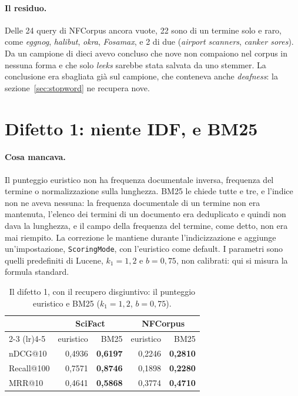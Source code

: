 \paragraph{Il residuo.} Delle 24 query di NFCorpus ancora vuote, 22 sono di un
termine solo e raro, come \emph{eggnog}, \emph{halibut}, \emph{okra},
\emph{Fosamax}, e 2 di due (\emph{airport scanners}, \emph{canker sores}). Da
un campione di dieci avevo concluso che nove non compaiono nel corpus in nessuna
forma e che solo \emph{leeks} sarebbe stata salvata da uno stemmer. La
conclusione era sbagliata già sul campione, che conteneva anche
\emph{deafness}: la sezione~\ref{sec:stopword} ne recupera nove.

\section{Difetto 1: niente IDF, e BM25}\label{sec:difetto1}

\paragraph{Cosa mancava.} Il punteggio euristico non ha frequenza documentale
inversa, frequenza del termine o normalizzazione sulla lunghezza. BM25
\cite{robertson2009bm25} le chiede tutte e tre, e l'indice non ne aveva nessuna:
la frequenza documentale di un termine non era mantenuta, l'elenco dei termini di
un documento era deduplicato e quindi non dava la lunghezza, e il campo della
frequenza del termine, come detto, non era mai riempito. La correzione le
mantiene durante l'indicizzazione e aggiunge un'impostazione,
\texttt{ScoringMode}, con l'euristico come default. I parametri sono quelli
predefiniti di Lucene, $k_1 = 1{,}2$ e $b = 0{,}75$, non calibrati: qui si misura
la formula standard.

\begin{table}[ht]
  \centering
  \begin{tabular}{lrrrr}
    \toprule
    & \multicolumn{2}{c}{SciFact} & \multicolumn{2}{c}{NFCorpus} \\
    \cmidrule(lr){2-3} \cmidrule(lr){4-5}
    & euristico & BM25 & euristico & BM25 \\
    \midrule
    nDCG@10 & 0,4936 & \textbf{0,6197} & 0,2246 & \textbf{0,2810} \\
    Recall@100 & 0,7571 & \textbf{0,8746} & 0,1898 & \textbf{0,2280} \\
    MRR@10 & 0,4641 & \textbf{0,5868} & 0,3774 & \textbf{0,4710} \\
    \bottomrule
  \end{tabular}
  \caption{Il difetto 1, con il recupero disgiuntivo: il punteggio euristico e
  BM25 ($k_1 = 1{,}2$, $b = 0{,}75$).}
  \label{tab:difetto1}
\end{table}

